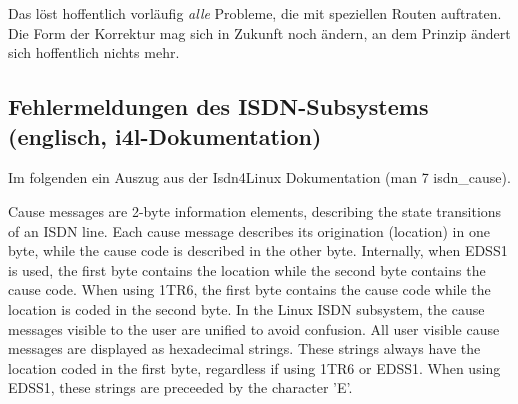 Das löst hoffentlich vorläufig \emph{alle} Probleme, die mit speziellen
Routen auftraten. Die Form der Korrektur mag sich in Zukunft noch
ändern, an dem Prinzip ändert sich hoffentlich nichts mehr.

{
  \subsection{Fehlermeldungen des ISDN-Subsystems (englisch, i4l-Dokumentation)}
}

Im folgenden ein Auszug aus der Isdn4Linux Dokumentation (man 7
isdn\_cause). 

Cause messages are 2-byte information elements, describing the state
transitions of an ISDN line. Each cause message describes its
origination (location) in one byte, while the cause code is described
in the other byte. Internally, when EDSS1 is used, the first byte
contains the location while the second byte contains the cause code.
When using 1TR6, the first byte contains the cause code while the
location is coded in the second byte. In the Linux ISDN subsystem, the
cause messages visible to the user are unified to avoid confusion. All
user visible cause messages are displayed as hexadecimal strings.
These strings always have the location coded in the first byte,
regardless if using 1TR6 or EDSS1. When using EDSS1, these strings are
preceeded by the character 'E'.


